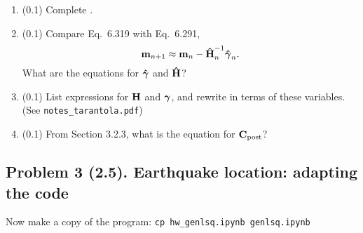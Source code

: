\documentclass[11pt,titlepage,fleqn]{article}
\begin{document}
\begin{enumerate}
\begin{enumerate}
\vspace{1cm}

\item (0.1) Complete .

\item (0.1) Compare Eq.~6.319 with Eq.~6.291,
%
\begin{equation}
\mbox{${\bf m}$}_{n+1} \approx \mbox{${\bf m}$}_{n} - \mbox{\boldmath{$\hat{\rm H}$}}^{-1}_n \mbox{\boldmath{$\hat{\gamma}$}}_n.
\label{mn}
\end{equation}
%
What are the equations for $\mbox{\boldmath{$\hat{\gamma}$}}$ and $\mbox{\boldmath{$\hat{\rm H}$}}$?

\vspace{1cm}

\item (0.1) List expressions for $\mbox{${\bf H}$}$ and $\mbox{\boldmath $\bf \gamma$}$, and rewrite  in terms of these variables. (See \verb+notes_tarantola.pdf+)

\vspace{1cm}

\item (0.1) From Section 3.2.3, what is the equation for $\mbox{${\bf C}$}_{\rm post}$?

\end{enumerate}

\end{enumerate}


\clearpage\pagebreak
\subsection*{Problem 3 (2.5). Earthquake location: adapting the code}

Now make a copy of the program: \verb+cp hw_genlsq.ipynb genlsq.ipynb+
\end{document}
